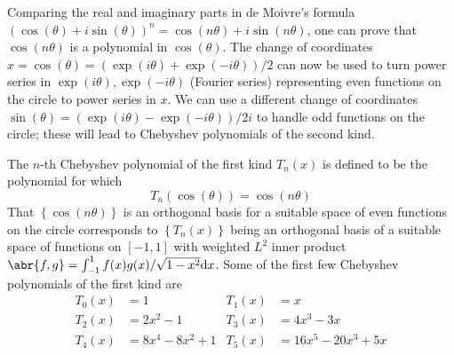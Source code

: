 \documentclass[11pt,leqno]{article}
\theoremstyle{plain}
\theoremstyle{definition}
\numberwithin{equation}{section}
\numberwithin{lem}{section}
\newcommand{\cbr}[1]{\left\{#1\right\}}
\begin{document}
\begin{figure}[h]
	\centering
\end{figure}
Comparing the real and imaginary parts in de Moivre's formula $(\cos(\theta) + i\sin(\theta))^n = \cos(n\theta) + i\sin(n\theta)$, one can prove that $\cos(n\theta)$ is a polynomial in $\cos(\theta)$. The change of coordinates $x = \cos(\theta) = (\exp(i\theta)+\exp(-i\theta))/2$ can now be used to turn power series in $\exp(i\theta),\exp(-i\theta)$ (Fourier series) representing even functions on the circle to power series in $x$. We can use a different change of coordinates $\sin(\theta) = (\exp(i\theta)-\exp(-i\theta))/2i$ to handle odd functions on the circle; these will lead to Chebyshev polynomials of the second kind.

The $n$-th Chebyshev polynomial of the first kind $T_n(x)$ is defined to be the polynomial for which
\[T_n(\cos(\theta)) = \cos(n\theta)\]
That $\cbr{\cos(n\theta)}$ is an orthogonal basis for a suitable space of even functions on the circle corresponds to $\cbr{T_n(x)}$ being an orthogonal basis of a suitable space of functions on $[-1,1]$ with weighted $L^2$ inner product $\abr{f,g} = \int_{-1}^1f(x)g(x)/\sqrt{1-x^2}\dd x$.
Some of the first few Chebyshev polynomials of the first kind are 
\begin{align*}
	T_0(x) &= 1 & T_1(x) &= x\\
	T_2(x) &= 2x^2-1& T_3(x) &=4x^3-3x \\
	T_4(x) &= 8x^4-8x^2+1& T_5(x) &= 16x^5-20x^3+5x
\end{align*}
\end{document}
